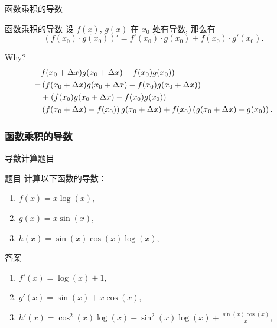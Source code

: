 \documentclass[
10pt,
aspectratio=43,
]{beamer}
\begin{document}
\begin{frame}{函数乘积的导数}
	\begin{block}{函数乘积的导数}
		设 $f(x)$, $g(x)$ 在 $x_0$ 处有导数, 那么有
		\[
			(f(x_0)\cdot g(x_0))' = f'(x_0)\cdot g(x_0) + f(x_0)\cdot g'(x_0).
		\]
	\end{block}
	\pause
	Why?
	\pause
	\begin{align*}
		  & f(x_0+\Delta x)g(x_0+\Delta x)-f(x_0) g(x_0))                                                 \\\bigskip
		= & \left(f(x_0+\Delta x)g(x_0+\Delta x)-f(x_0) g(x_0+\Delta x)\right)                            \\\smallskip
		  & + \left(f(x_0)g(x_0+\Delta x)-f(x_0) g(x_0)\right)                                            \\\bigskip
		= & \left(f(x_0+\Delta x)-f(x_0)\right)g(x_0+\Delta x)+f(x_0)\left(g(x_0+\Delta x)-g(x_0)\right).
	\end{align*}
\end{frame}

\begin{frame}
	\frametitle{函数乘积的导数}{导数计算题目}
	\begin{exampleblock}{题目}
		计算以下函数的导数：
		\begin{enumerate}
			\item $f(x) = x \log(x)$,
			\item $g(x) = x \sin(x)$,
			\item $h(x) = \sin(x) \cos(x) \log(x)$,
		\end{enumerate}
	\end{exampleblock}

	\pause

	\begin{exampleblock}{答案}
		\begin{enumerate}
			\item $f'(x) = \log(x) + 1$,
			\item $g'(x) = \sin(x) + x \cos(x)$,
			\item $h'(x) = \cos^2(x) \log(x) - \sin^2(x) \log(x) + \displaystyle\frac{\sin(x)\cos(x)}{x}$,
		\end{enumerate}
	\end{exampleblock}
\end{frame}
\end{document}

